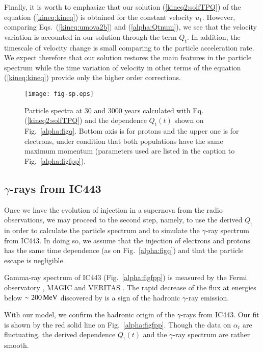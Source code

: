 \documentclass{aa}
\newcommand\un[1]{{\,\rm #1}}
\newcommand\rs[1]{_\mathrm{#1}}
\newcommand\g{$\gamma$}
\begin{document}
Finally, it is worth to emphasize that our solution (\ref{kineq2:solfTPQ}) of the equation (\ref{kineq:kineq}) is obtained for the constant velocity $u_1$. However, comparing Eqs.~(\ref{kineq:umova2b}) and (\ref{alpha:Qtnum}), we see that the velocity variation is accounted in our solution through the term $Q\rs{t}$. In addition, the timescale of velocity change is small comparing to the particle acceleration rate. We expect therefore that our solution restores the main features in the particle spectrum while the time variation of velocity in other terms of the equation (\ref{kineq:kineq}) provide only the higher order corrections.

\begin{figure}
 \centering
 \texttt{[image: fig-sp.eps]}
 \caption{
Particle spectra at 30 and 3000 years calculated with Eq.(\ref{kineq2:solfTPQ}) and the dependence $Q\rs{t}(t)$ shown on Fig.~\ref{alpha:figq}. Bottom axis is for protons and the upper one is for electrons, under condition that both populations have the same maximum momentum (parameters used are listed in the caption to Fig.~\ref{alpha:figfpp}). 
               }
 \label{alpha:figsp}
\end{figure}

\subsection{\g-rays from IC443}

Once we have the evolution of injection in a supernova from the radio observations, we may proceed to the second step, namely, to use the derived $Q\rs{t}$ in order to calculate the particle spectrum and to simulate the \g-ray spectrum from IC443. In doing so, we assume that the injection of electrons and protons has the same time dependence (as on Fig.~\ref{alpha:figq}) and that the particle escape is negligible. 

Gamma-ray spectrum of IC443 (Fig.~\ref{alpha:figfpp}) is measured by the Fermi observatory \citep{Ackermann-etal-2013}, MAGIC \citep{Albert-etal-2007} and VERITAS \citep{Acciari-etal-2009}. 
The rapid decrease of the flux at energies below $\sim 200\un{MeV}$ discovered by \citet{Ackermann-etal-2013} is a sign of the hadronic \g-ray emission.

With our model, we confirm the hadronic origin of the \g-rays from IC443. Our fit is shown by the red solid line on Fig.~\ref{alpha:figfpp}. Though the data on $\alpha\rs{r}$ are fluctuating, the derived dependence $Q\rs{t}(t)$ and the \g-ray spectrum are rather smooth. 
\end{document}

